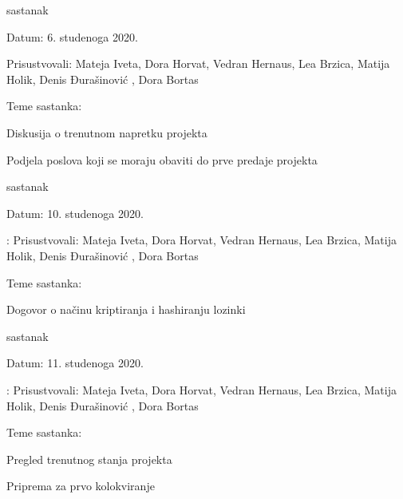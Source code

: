 \begin{packed_enum}
\begin{packed_item}
\begin{packed_item}
			\end{packed_item}
		\end{packed_item}
	\item sastanak
		\item[] \begin{packed_item}
			\item Datum: 6. studenoga 2020.
			\item Prisustvovali: Mateja Iveta, Dora Horvat, Vedran Hernaus, Lea Brzica, Matija Holik, Denis Đurašinović , Dora Bortas
			\item Teme sastanka:
			\begin{packed_item}
				\item Diskusija o trenutnom napretku projekta
				\item Podjela poslova koji se moraju obaviti do prve predaje projekta
			\end{packed_item}
		\end{packed_item}
	
		\item sastanak
		\item[] \begin{packed_item}
			\item Datum: 10. studenoga 2020.
			\item: Prisustvovali: Mateja Iveta, Dora Horvat, Vedran Hernaus, Lea Brzica, Matija Holik, Denis Đurašinović , Dora Bortas
			\item Teme sastanka:
			\begin{packed_item}
				\item Dogovor o načinu kriptiranja i hashiranju lozinki
			\end{packed_item}
		\end{packed_item}
	
			\item sastanak
		\item[] \begin{packed_item}
			\item Datum: 11. studenoga 2020.
			\item: Prisustvovali: Mateja Iveta, Dora Horvat, Vedran Hernaus, Lea Brzica, Matija Holik, Denis Đurašinović , Dora Bortas
			\item Teme sastanka:
			\begin{packed_item}
				\item Pregled trenutnog stanja projekta
				\item Priprema za prvo kolokviranje
				
			\end{packed_item}
		\end{packed_item}
	

\end{packed_enum}
